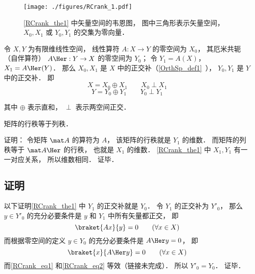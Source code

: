 

\begin{figure}[ht]
\centering
\texttt{[image: ./figures/RCrank\_1.pdf]}
\caption{\autoref{RCrank_the1} 中矢量空间的韦恩图， 图中三角形表示矢量空间， $X_0,X_1$ 或 $Y_0, Y_1$ 的交集为零向量．} \label{RCrank_fig1}
\end{figure}

\begin{theorem}{}\label{RCrank_the1}
令 $X, Y$ 为有限维线性空间， 线性算符 $A:X \to Y$ 的零空间为 $X_0$， 其厄米共轭（自伴算符） $A\Her: Y \to X$ 的零空间为 $Y_0$； 令 $Y_1 = A(X)$， $X_1 = A\Her(Y)$． 那么 $X_0, X_1$ 是 $X$ 中的正交补（\autoref{OrthSp_def1}~）， $Y_0, Y_1$ 是 $Y$ 中的正交补． 即
\begin{equation}
X = X_0 \oplus X_1 \qquad X_0 \perp X_1
\end{equation}
\begin{equation}
Y = Y_0 \oplus Y_1 \qquad Y_0 \perp Y_1
\end{equation}
\end{theorem}
其中 $\oplus$ 表示直和， $\perp$ 表示两空间正交．

\begin{corollary}{}
矩阵的行秩等于列秩．
\end{corollary}
证明： 令矩阵 $\mat A$ 的算符为 $A$， 该矩阵的行秩就是 $Y_1$ 的维数． 而矩阵的列秩等于 $\mat A\Her$ 的行秩， 也就是 $X_1$ 的维数． \autoref{RCrank_the1} 中 $X_1, Y_1$ 有一一对应关系， 所以维数相同． 证毕．

\subsection{证明}
以下证明\autoref{RCrank_the1} 中 $Y_1$ 的正交补就是 $Y_0$． 令 $Y_1$ 的正交补为 $Y'_0$， 那么 $y \in Y'_0$ 的充分必要条件是 $y$ 和 $Y_1$ 中所有矢量都正交， 即
\begin{equation}\label{RCrank_eq1}
\braket{Ax}{y} = 0 \qquad (\forall x \in X)
\end{equation}
而根据零空间的定义 $y \in Y_0$ 的充分必要条件是 $A\Her y = 0$， 即
\begin{equation}\label{RCrank_eq2}
\braket{x}{A\Her y} = 0 \qquad (\forall x \in X)
\end{equation}
而\autoref{RCrank_eq1} 和\autoref{RCrank_eq2} 等效（链接未完成）． 所以 $Y'_0 = Y_0$． 证毕．
